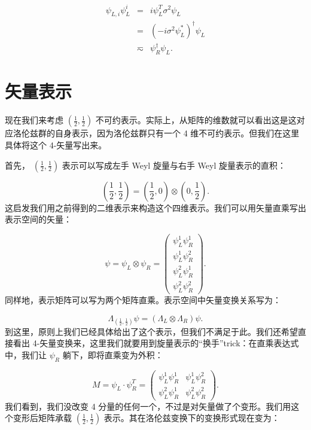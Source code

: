 \documentclass[10pt,UTF8]{ctexart}
\begin{document}
\begin{eqnarray}
\psi_{L,i}\psi_{L}^{i} & = & i\psi_{L}^{T}\sigma^{2}\psi_{L}\nonumber \\
 & = & \left(-i\sigma^{2}\psi_{L}^{*}\right)^{\dagger}\psi_{L}\nonumber \\
 & \eqsim & \psi_{R}^{\dagger}\psi_{L}.
\end{eqnarray}


\section*{矢量表示}
\noindent
现在我们来考虑 $\left(\frac{1}{2},\frac{1}{2}\right)$ 不可约表示。实际上，从矩阵的维数就可以看出这是这对应洛伦兹群的自身表示，因为洛伦兹群只有一个
4 维不可约表示。但我们在这里具体将这个 4-矢量写出来。

首先， $\left(\frac{1}{2},\frac{1}{2}\right)$ 表示可以写成左手 Weyl 旋量与右手 Weyl
旋量表示的直积：

\begin{equation}
\left(\frac{1}{2},\frac{1}{2}\right)=\left(\frac{1}{2},0\right)\otimes\left(0,\frac{1}{2}\right).
\end{equation}
这启发我们用之前得到的二维表示来构造这个四维表示。我们可以用矢量直乘写出表示空间的矢量：

\begin{equation}
\psi=\psi_{L}\otimes\psi_{R}=\left(\begin{array}{c}
\psi_{L}^{1}\psi_{R}^{1}\\
\psi_{L}^{1}\psi_{R}^{2}\\
\psi_{L}^{2}\psi_{R}^{1}\\
\psi_{L}^{2}\psi_{R}^{2}
\end{array}\right).
\end{equation}
同样地，表示矩阵可以写为两个矩阵直乘。表示空间中矢量变换关系写为：

\begin{equation}
\Lambda_{\left(\frac{1}{2},\frac{1}{2}\right)}\psi=\left(\Lambda_{L}\otimes\Lambda_{R}\right)\psi.
\end{equation}
到这里，原则上我们已经具体给出了这个表示，但我们不满足于此。我们还希望直接看出 4-矢量变换来，这里我们就要用到旋量表示的“换手”trick：在直乘表达式中，我们让
$\psi_{R}$ 躺下，即将直乘变为外积：

\[
M=\psi_{L}\cdot\psi_{R}^{T}=\left(\begin{array}{cc}
\psi_{L}^{1}\psi_{R}^{1} & \psi_{L}^{1}\psi_{R}^{2}\\
\psi_{L}^{2}\psi_{R}^{1} & \psi_{L}^{2}\psi_{R}^{2}
\end{array}\right).
\]
我们看到，我们没改变 4 分量的任何一个，不过是对矢量做了个变形。我们用这个变形后矩阵承载 $\left(\frac{1}{2},\frac{1}{2}\right)$
表示。其在洛伦兹变换下的变换形式现在变为：
\end{document}
